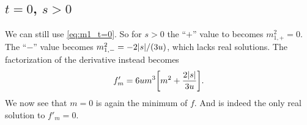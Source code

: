 \documentclass[11pt,letter, swedish, english
]{article}
\begin{document}
\subsection{$t=0$, $s>0$}
We can still use \eqref{eq:m1_t=0}. So for $s>0$ the ``$+$'' value to
becomes $m_{1,+}^2=0$. The ``$-$'' value becomes
$m_{1,-}^2=-2\abs{s}/(3u)$, which lacks real solutions. 
The factorization of the derivative instead becomes
\begin{equation}%
f'_m=6um^3\qty[m^2+\frac{2\abs{s}}{3u}].
\end{equation}
We now see that $m=0$ is again the minimum of $f$. And is indeed the
only real solution to $f'_m=0$.
\end{document}
